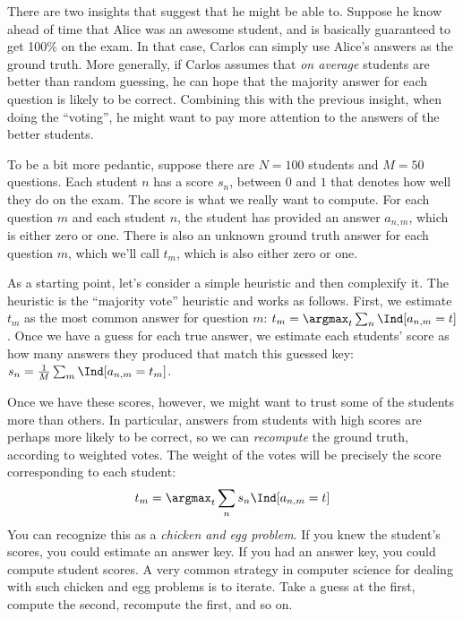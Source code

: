There are two insights that suggest that he might be able to.
Suppose he know ahead of time that Alice was an awesome student, and is basically guaranteed to get 100\% on the exam.
In that case, Carlos can simply use Alice's answers as the ground truth.
More generally, if Carlos assumes that \emph{on average} students are better than random guessing, he can hope that the majority answer for each question is likely to be correct.
Combining this with the previous insight, when doing the ``voting'', he might want to pay more attention to the answers of the better students.

To be a bit more pedantic, suppose there are $N=100$ students and $M=50$ questions.
Each student $n$ has a score $s_n$, between $0$ and $1$ that denotes how well they do on the exam.
The score is what we really want to compute.
For each question $m$ and each student $n$, the student has provided an answer $a_{n,m}$, which is either zero or one.
There is also an unknown ground truth answer for each question $m$, which we'll call $t_m$, which is also either zero or one.

As a starting point, let's consider a simple heuristic and then complexify it.
The heuristic is the ``majority vote'' heuristic and works as follows.
First, we estimate $t_m$ as the most common answer for question $m$:
$t_m = \argmax_t \sum_n \Ind[a_{n,m} = t]$.
Once we have a guess for each true answer, we estimate each students' score as how many answers they produced that match this guessed key:
$s_n = \frac 1 M \sum_m \Ind[a_{n,m} = t_m]$.

Once we have these scores, however, we might want to trust some of the students more than others.
In particular, answers from students with high scores are perhaps more likely to be correct, so we can \emph{recompute} the ground truth, according to weighted votes.
The weight of the votes will be precisely the score corresponding to each student:
%
\begin{align}
  t_m = \argmax_t \sum_n s_n \Ind[a_{n,m} = t]
\end{align}
%
You can recognize this as a \emph{chicken and egg problem}. If you knew the student's scores, you could estimate an answer key. If you had an answer key, you could compute student scores.
A very common strategy in computer science for dealing with such chicken and egg problems is to iterate.
Take a guess at the first, compute the second, recompute the first, and so on.

